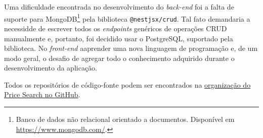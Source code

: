 Uma dificuldade encontrada no desenvolvimento do \textit{back-end} foi a falta de suporte para MongoDB\footnote{Banco de dados não relacional orientado a documentos. Disponível em \url{https://www.mongodb.com/}.} pela biblioteca \texttt{@nestjsx/crud}. Tal fato demandaria a necessidde de escrever todos os \textit{endpoints} genéricos de operações CRUD manualmente e, portanto, foi decidido usar o PostgreSQL, suportado pela biblioteca. No \textit{front-end} aaprender uma nova linguagem de programação e, de um modo geral, o desafio de agregar todo o conhecimento adquirido durante o desenvolvimento da aplicação.

Todos os repositórios de código-fonte podem ser encontrados na \href{https://github.com/price-search}{organização do Price Search no GitHub}.
